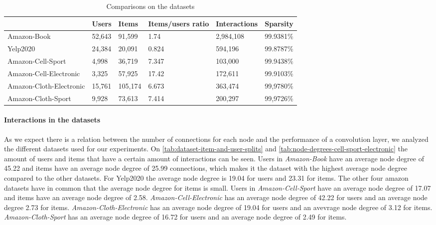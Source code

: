 \begin{table*}[]
    \centering
    \begin{tabular}{|l|l|l|l|l|l|}
        \hline
                                & Users  & Items   & Items/users ratio & Interactions & Sparsity  \\ \hline
        Amazon-Book             & 52,643 & 91,599  & 1.74              & 2,984,108    & 99.9381\% \\ \hline
        Yelp2020                & 24,384 & 20,091  & 0.824             & 594,196      & 99.8787\% \\ \hline
        Amazon-Cell-Sport       & 4,998  & 36,719  & 7.347             & 103,000      & 99.9438\% \\ \hline
        Amazon-Cell-Electronic  & 3,325  & 57,925  & 17.42             & 172,611      & 99.9103\% \\ \hline
        Amazon-Cloth-Electronic & 15,761 & 105,174 & 6.673             & 363,474      & 99,9780\% \\ \hline
        Amazon-Cloth-Sport      & 9,928  & 73,613  & 7.414             & 200,297      & 99,9726\% \\ \hline
    \end{tabular}
    \caption{Comparisons on the datasets}
    \label{tab:dataset-comparison}
\end{table*}

\paragraph{Interactions in the datasets}
As we expect there is a relation between the number of connections for each node and the performance of a convolution layer, we analyzed the different datasets used for our experiments.
On \autoref{tab:dataset-item-and-user-splits} and \autoref{tab:node-degrees-cell-sport-electronic} the amount of users and items that have a certain amount of interactions can be seen.
Users in \textit{Amazon-Book} have an average node degree of 45.22 and items have an average node degree of 25.99 connections, which makes it the dataset with the highest average node degree compared to the other datasets.
For Yelp2020 the average node degree is 19.04 for users and 23.31 for items.
The other four amazon datasets have in common that the average node degree for items is small.
Users in \textit{Amazon-Cell-Sport} have an average node degree of 17.07 and items have an average node degree of 2.58.
\textit{Amazon-Cell-Electronic} has an average node degree of 42.22 for users and an average node degree 2.73 for items.
\textit{Amazon-Cloth-Electronic} has an average node degree of 19.04 for users and an avevrage node degree of 3.12 for items.
\textit{Amazon-Cloth-Sport} has an average node degree of 16.72 for users and an average node degree of 2.49 for items.

